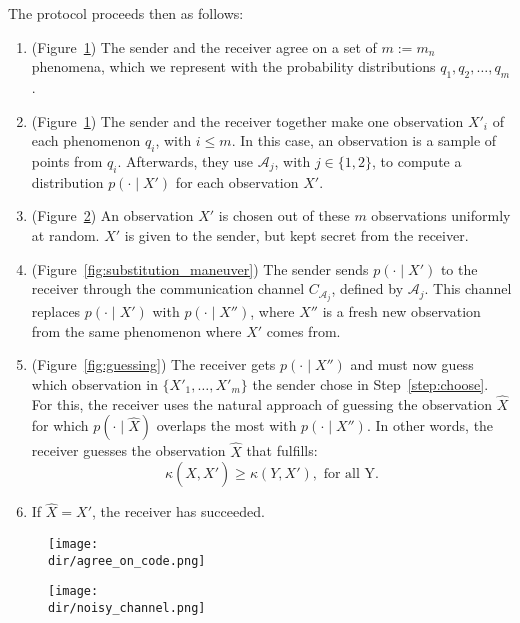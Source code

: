 The protocol proceeds then as follows:

\begin{enumerate}
\item\label{step:sample_observations} (Figure~\ref{fig:agree_on_code}) The sender and the receiver agree on a set of $m := m_n$ phenomena, which we represent with the probability distributions $q_1, q_2, \ldots, q_m$.
\item (Figure~\ref{fig:agree_on_code}) The sender and the receiver together make one observation $X'_i$ of each phenomenon $q_i$, with $i \leq m$. In this case, an observation is a sample of points from $q_i$. Afterwards, they use $\mathcal{A}_j$, with $j \in \{1, 2\}$, to compute a distribution $p(\cdot \mid X')$ for each observation $X'$.
\item\label{step:choose} (Figure~\ref{fig:noisy_channel}) An observation $X'$ is chosen out of these $m$ observations uniformly at random. $X'$ is given to the sender, but kept secret from the receiver.
\item (Figure~\ref{fig:substitution_maneuver}) The sender sends $p(\cdot \mid X')$ to the receiver through the communication channel $C_{\mathcal{A}_j}$, defined by $\mathcal{A}_j$. This channel replaces $p(\cdot \mid X')$ with $p(\cdot \mid X'')$, where $X''$ is a fresh new observation from the same phenomenon where $X'$ comes from.
\item (Figure~\ref{fig:guessing}) The receiver gets $p(\cdot \mid X'')$ and must now guess which observation in $\{X'_1, \ldots, X'_m\}$ the sender chose in Step~\ref{step:choose}. For this, the receiver uses the natural approach of guessing the observation $\hat{X}$ for which $p(\cdot \mid \hat{X})$ overlaps the most with $p(\cdot \mid X'')$. In other words, the receiver guesses the observation $\hat{X}$ that fulfills:
%
$$\kappa\left(\hat{X}, X'\right) \geq \kappa\left(Y, X'\right), \text{ for all Y.}$$
%
\item If $\hat{X} = X'$, the receiver has succeeded.
\end{enumerate}

\begin{figure}
\texttt{[image: \\dir/agree\_on\_code.png]}
\caption{}
\label{fig:agree_on_code}
\end{figure}

\begin{figure}
\texttt{[image: \\dir/noisy\_channel.png]}
\caption{}
\label{fig:noisy_channel}
\end{figure}

